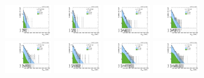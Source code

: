 \begin{figure}[htbp]
  \includegraphics[width=0.18\textwidth]{fig/fitValidation/PostFit_SR_MVV__mu_HP_vbf_LDy_Run2.pdf}
  \includegraphics[width=0.18\textwidth]{fig/fitValidation/PostFit_SR_MVV__e_HP_vbf_LDy_Run2.pdf}
  \includegraphics[width=0.18\textwidth]{fig/fitValidation/PostFit_SR_MVV__mu_LP_vbf_LDy_Run2.pdf}
  \includegraphics[width=0.18\textwidth]{fig/fitValidation/PostFit_SR_MVV__e_LP_vbf_LDy_Run2.pdf}\\
  \includegraphics[width=0.18\textwidth]{fig/fitValidation/PostFit_SR_MVV__mu_HP_bb_HDy_Run2.pdf}
  \includegraphics[width=0.18\textwidth]{fig/fitValidation/PostFit_SR_MVV__e_HP_bb_HDy_Run2.pdf}
  \includegraphics[width=0.18\textwidth]{fig/fitValidation/PostFit_SR_MVV__mu_LP_bb_HDy_Run2.pdf}
  \includegraphics[width=0.18\textwidth]{fig/fitValidation/PostFit_SR_MVV__e_LP_bb_HDy_Run2.pdf}\\

\end{figure}
